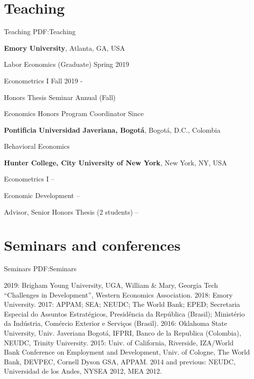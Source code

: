 \documentclass[letterpaper,10pt,oneside]{article}
\begin{document}
\begin{body}
 


\section
{Teaching}
{Teaching}
{PDF:Teaching}

\textbf{Emory University},
Atlanta, GA, USA
\par
Labor Economics (Graduate)
\hfill
Spring 2019

Econometrics I
\hfill
Fall 2019 -        


\par
Honors Thesis Seminar
\hfill
Annual (Fall)

\par
Economics Honors Program Coordinator
\hfill
Since 

\smallskip
\smallskip


\textbf{Pontificia Universidad Javeriana, Bogot\'{a}},
Bogot\'{a}, D.C., Colombia
\par
Behavioral Economics
\hfill
{}

\smallskip
\smallskip

\textbf{Hunter College, City University of New York},
New York, NY, USA
\par
Econometrics I
\hfill
{} --
\par
Economic Development
\hfill
{} --
\par
Advisor, Senior Honors Thesis (2 students)
\hfill
{} --



\section
{Seminars and conferences}
{Seminars}
{PDF:Seminars}
\par
2019: Brigham Young University, UGA, William \& Mary, Georgia Tech ``Challenges in Development'', Western Economics Association. 2018: Emory University. 2017: APPAM; SEA; NEUDC; The World Bank; EPED; Secretaria Especial do Assuntos Estrat\'{e}gicos, Presid\^{e}ncia da Rep\'{u}blica (Brasil); Minist\'{e}rio da Ind\'{u}stria, Com\'{e}rcio Exterior e Servi\c{c}os (Brasil). 2016: Oklahoma State University, Univ. Javeriana Bogot\'{a}, IFPRI, Banco de la Republica (Colombia), NEUDC, Trinity University. 2015: Univ. of California, Riverside, IZA/World Bank Conference on Employment and Development, Univ. of Cologne, The World Bank, DEVPEC, Cornell Dyson GSA, APPAM. 2014 and previous: NEUDC, Universidad de los Andes, NYSEA 2012, MEA 2012.


\end{body}
\end{document}
